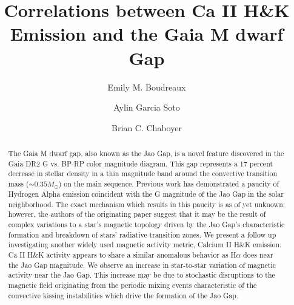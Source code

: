 \documentclass[twocolumn,linenumbers]{aastex62}
\begin{document}
\title{Correlations between Ca II H\&K Emission and the Gaia M dwarf Gap}


\author[0000-0002-2600-7513]{Emily M. Boudreaux}

\author[0000-0001-9828-3229]{Aylin Garcia Soto}

\author[0000-0003-3096-4161]{Brian C. Chaboyer}

\received{}
\revised{}
\revised{}
\accepted{}


\begin{abstract}
  The Gaia M dwarf gap, also known as the Jao Gap, is a novel feature
  discovered in the Gaia DR2 G vs. BP-RP color magnitude diagram. This gap
  represents a 17 percent decrease in stellar density in a thin magnitude band around the
  convective transition mass ($\sim 0.35 M_{\odot}$) on the main sequence.
  Previous work has demonstrated a paucity of Hydrogen
  Alpha emission coincident with the G magnitude of the Jao Gap in the solar
  neighborhood. The exact mechanism which results in this paucity is as of yet
  unknown; however, the authors of the originating paper suggest that it may
  be the result of complex variations to a star's magnetic topology driven by
  the Jao Gap's characteristic formation and breakdown of stars' radiative
  transition zones. We present a follow up investigating another widely used
  magnetic activity metric, Calcium II H\&K emission. Ca II H\&K activity
  appears to share a similar anomalous behavior as H$\alpha$ does near the Jao
  Gap magnitude. We observe an increase in star-to-star variation of magnetic
  activity near the Jao Gap. This increase may be due to stochastic disruptions
  to the magnetic field originating from the periodic mixing events
  characteristic of the convective kissing instabilities which drive the
  formation of the Jao Gap.

\end{abstract}



\end{document}
